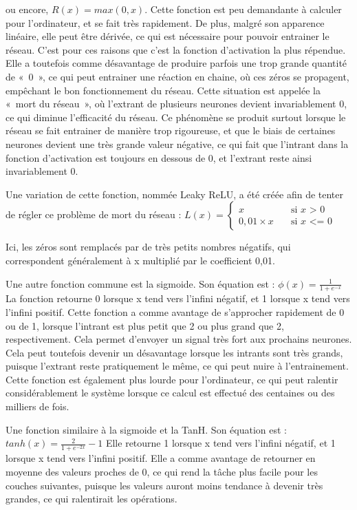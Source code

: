\documentclass[letterpaper,10pt,french]{sphinxmanual}
\begin{document}
ou encore, \( R(x) = max(0, x)\). Cette fonction est peu demandante à calculer pour l’ordinateur, et se fait très rapidement. De plus, malgré son apparence linéaire,
elle peut être dérivée, ce qui est nécessaire pour pouvoir entrainer le réseau. C’est pour ces raisons que c’est la fonction d’activation la plus répendue.
Elle a toutefois comme désavantage de produire parfois une trop grande quantité de « 0 », ce qui peut entrainer une réaction en chaine, où ces zéros se propagent,
empêchant le bon fonctionnement du réseau. Cette situation est appelée la « mort du réseau », où l’extrant de plusieurs neurones devient invariablement 0, ce qui
diminue l’efficacité du réseau. Ce phénomène se produit surtout lorsque le réseau se fait entrainer de manière trop rigoureuse, et que le biais de certaines
neurones devient une très grande valeur négative, ce qui fait que l’intrant dans la fonction d’activation est toujours en dessous de 0, et l’extrant reste ainsi
invariablement 0.

Une variation de cette fonction, nommée Leaky ReLU, a été créée afin de tenter de régler ce problème de mort du réseau : \( 
L(x)=
\begin{cases}
 x & \quad \text{si } x \text{ > 0}\\
 0,01 \times x & \quad \text{si } x \text{ <= 0}
\end{cases}
\)

Ici, les zéros sont remplacés par de très petits nombres négatifs, qui correspondent généralement à x multiplié par le coefficient 0,01.

Une autre fonction commune est la sigmoide. Son équation est :
\( \phi(x) = 
\frac{1}{1 + e^{-x}}
\)
La fonction retourne 0 lorsque x tend vers l’infini négatif, et 1 lorsque x tend vers l’infini positif. Cette fonction a comme avantage de
s’approcher rapidement de 0 ou de 1, lorsque l’intrant  est plus petit que \sphinxhyphen{}2 ou plus grand que 2, respectivement. Cela permet d’envoyer
un signal très fort aux prochains neurones. Cela peut toutefois devenir un désavantage lorsque les intrants sont très grands, puisque l’extrant
reste pratiquement le même, ce qui peut nuire à l’entrainement. Cette fonction est également plus lourde pour l’ordinateur, ce qui peut ralentir
considérablement le système lorsque ce calcul est effectué des centaines ou des milliers de fois.

Une fonction similaire à la sigmoide et la TanH. Son équation est :
\( tanh(x) = 
\frac{2}{1 + e^{-2x}} - 1
\)
Elle retourne \sphinxhyphen{}1 lorsque x tend vers l’infini négatif, et 1 lorsque x tend vers l’infini positif. Elle a comme avantage de retourner en moyenne
des valeurs proches de 0, ce qui rend la tâche plus facile pour les couches suivantes, puisque les valeurs auront moins tendance à devenir très grandes,
ce qui ralentirait les opérations.
\end{document}
